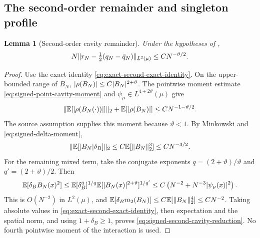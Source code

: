 \documentclass[11pt,reqno]{amsart}
\numberwithin{equation}{section}
\theoremstyle{plain}
\newtheorem{lemma}[lemma]{Lemma}
\theoremstyle{remark}
\DeclarePairedDelimiter{\abs}{\lvert}{\rvert}
\DeclarePairedDelimiter{\norm}{\lVert}{\rVert}
\newcommand{\E}{{\mathbb{E}}}
\begin{document}
\subsection{The second-order remainder and singleton profile}
\label{subsec:signed-second-cavity}

\begin{lemma}[Second-order cavity remainder]
\label{lem:signed-second-cavity-reduction}
Under the hypotheses of ,
\begin{equation}\label{eq:signed-second-cavity-reduction}
 N\norm{r_N-\tfrac12(q_N-\bar q_N)}_{L^2(\mu)}
 \leq C N^{-\vartheta/2}.
\end{equation}
\end{lemma}
\begin{proof}
Use the exact identity \eqref{eq:exact-second-exact-identity}.  On the
upper-bounded range of $B_N$, $\abs{\rho(B_N)}\leq C\abs{B_N}^{2+\vartheta}$.
The pointwise moment estimate \eqref{eq:signed-point-cavity-moment} and
$\psi_\mu\in L^{4+2\vartheta}(\mu)$ give
\begin{equation}\label{eq:signed-rho-bound}
 \norm{\E[\abs{\rho(B_N(\cdot))}]}_2
       +\E[\abs{\bar\rho(B_N)}]\leq C N^{-1-\vartheta/2}.
\end{equation}
The source assumption supplies this moment because $\vartheta<1$.
By Minkowski and \eqref{eq:signed-delta-moment},
\begin{equation}\label{eq:signed-Bdelta-bound}
 \norm{\E[\abs{B_N}\delta_B]}_2
 \leq C\E[\norm{B_N}_2^3]\leq CN^{-3/2}.
\end{equation}
For the remaining mixed term, take the conjugate exponents
$q=(2+\vartheta)/\vartheta$ and $q'=(2+\vartheta)/2$.  Then
\begin{equation}\label{eq:signed-delta-square-bound}
 \E[\delta_B B_N(x)^2]
 \leq\E[\delta_B^q]^{1/q}
          \E[\abs{B_N(x)}^{2+\vartheta}]^{1/q'}
 \leq C\left(N^{-2}+N^{-3}\abs{\psi_\mu(x)}^2\right).
\end{equation}
This is $O(N^{-2})$ in $L^2(\mu)$, and
$\E[\delta_Bm_2(B_N)]\leq C\E[\norm{B_N}_2^4]\leq CN^{-2}$.
Taking absolute values in \eqref{eq:exact-second-exact-identity}, then
expectation and the spatial norm, and using $1+\delta_B\geq1$, proves
\eqref{eq:signed-second-cavity-reduction}.  No fourth pointwise moment
of the interaction is used.
\end{proof}
\end{document}
